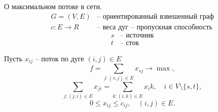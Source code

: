 \begin{example}
    О максимальном потоке в сети.
    \[
        \begin{array}{ll}
            G = (V,E)          & \text{-- ориентированный взвешенный граф}    \\
            c: E \rightarrow R & \text{-- веса дуг -- пропускная способность}
        \end{array}
    \]
    \[
        \begin{array}{ll}
            s & \text{-- источник} \\
            t & \text{-- сток}
        \end{array}
    \]

    Пусть $ x_{ij} $ -- поток по дуге $ (i,j)\in E $
    \[
        f = \sum_{j: (s,j)\in E} x_{sj} \longrightarrow \max,
    \]
    \[
        \sum_{j:(j,i)\in E}x_{ji} = \sum_{k:(i,k)\in E}x_ik, \quad i \in V \setminus\{s,t\},
    \]
    \[
        0 \leqslant x_{ij} \leqslant c_{ij}, \quad (i,j) \in E.
    \]
\end{example}

